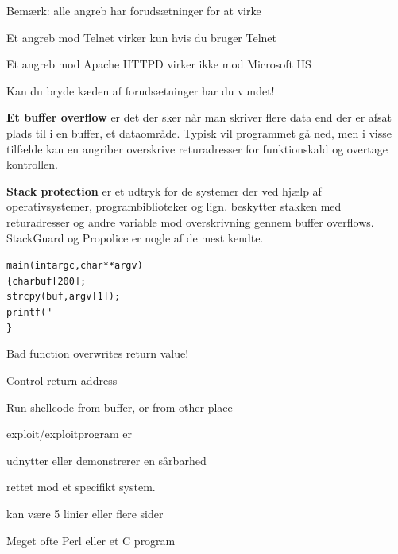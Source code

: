 \documentclass[20pt,landscape,a4paper,footrule]{foils}
\begin{document}
\begin{list1}
\item Bemærk: alle angreb har forudsætninger for at virke
\item Et angreb mod Telnet virker kun hvis du bruger Telnet
\item Et angreb mod Apache HTTPD virker ikke mod Microsoft IIS
\item Kan du bryde kæden af forudsætninger har du vundet!
\end{list1}



\begin{list1}
\item {\bfseries Et buffer overflow}
er det der sker når man skriver flere data end der er afsat plads til
i en buffer, et dataområde. Typisk vil programmet gå ned, men i visse
tilfælde kan en angriber overskrive returadresser for funktionskald og
overtage kontrollen.
\item {\bfseries Stack protection}
er et udtryk for de systemer der ved hjælp af operativsystemer,
programbiblioteker og lign. beskytter stakken med returadresser og
andre variable mod overskrivning gennem buffer overflows. StackGuard
og Propolice er nogle af de mest kendte.
\end{list1}




\begin{alltt}
main(int argc, char **argv)
\{      char buf[200];
        strcpy(buf, argv[1]);
        printf("%
\}
\end{alltt}





\begin{list1}
\item Bad function overwrites return value!
\item Control return address
\item Run shellcode from buffer, or from other place
\end{list1}



\begin{list1}
\item exploit/exploitprogram er
\begin{list2}
\item udnytter eller demonstrerer en sårbarhed
\item rettet mod et specifikt system.
\item kan være 5 linier eller flere sider
\item Meget ofte Perl eller et C program
\end{list2}
\end{list1}
\end{document}

